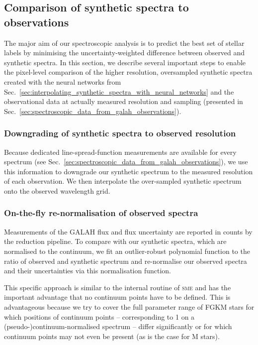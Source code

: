 \documentclass[
  journal=pasa,
  manuscript=research-paper, %
  year=2024,
  volume=37
]{cup-journal}
\newcommand{\sme}{\textsc{sme}\xspace}
\begin{document}
\subsection{Comparison of synthetic spectra to observations}
\label{sec:comparison_synthetic_spectra_to_observations}

The major aim of our spectroscopic analysis is to predict the best set of stellar labels by minimising the uncertainty-weighted difference between observed and synthetic spectra. In this section, we describe several important steps to enable the pixel-level comparison of the higher resolution, oversampled synthetic spectra created with the neural networks from Sec.~\ref{sec:interpolating_synthetic_spectra_with_neural_networks} and the observational data at actually measured resolution and sampling (presented in Sec.~\ref{sec:spectroscopic_data_from_galah_observations}).

\subsubsection{Downgrading of synthetic spectra to observed resolution}

Because dedicated line-spread-function measurements are available for every spectrum (see Sec.~\ref{sec:spectroscopic_data_from_galah_observations}), we use this information to downgrade our synthetic spectrum to the measured resolution of each observation. We then interpolate the over-sampled synthetic spectrum onto the observed wavelength grid.

\subsubsection{On-the-fly re-normalisation of observed spectra}

Measurements of the GALAH flux and flux uncertainty are reported in counts by the reduction pipeline. To compare with our synthetic spectra, which are normalised to the continuum, we fit an outlier-robust polynomial function to the ratio of observed and synthetic spectrum and re-normalise our observed spectra and their uncertainties via this normalisation function.

This specific approach is similar to the internal routine of \sme \citep{Piskunov2017} and has the important advantage that no continuum points have to be defined. This is advantageous because we try to cover the full parameter range of FGKM stars for which positions of continuum points -- corresponding to 1 on a (pseudo-)continuum-normalised spectrum -- differ significantly or for which continuum points may not even be present (as is the case for M stars).
\end{document}
